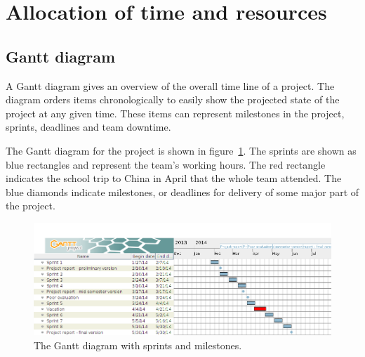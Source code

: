 \section{Allocation of time and resources}

\subsection{Gantt diagram}
\label{sec:gantt}

A Gantt diagram gives an overview of the overall time line of a project. The diagram orders items chronologically to easily show the projected state of the project at any given time. These items can represent milestones in the project, sprints, deadlines and team downtime. 

The Gantt diagram for the project is shown in figure~\ref{fig:gantt}. The sprints are shown as blue rectangles and represent the team's working hours. The red rectangle indicates the school trip to China in April that the whole team attended. The blue diamonds indicate milestones, or deadlines for delivery of some major part of the project.


\begin{figure}[H]
\includegraphics[width=\textwidth]{ch/projectManagement/fig/gantt.png}
\caption{The Gantt diagram with sprints and milestones.}
\label{fig:gantt}
\end{figure}
